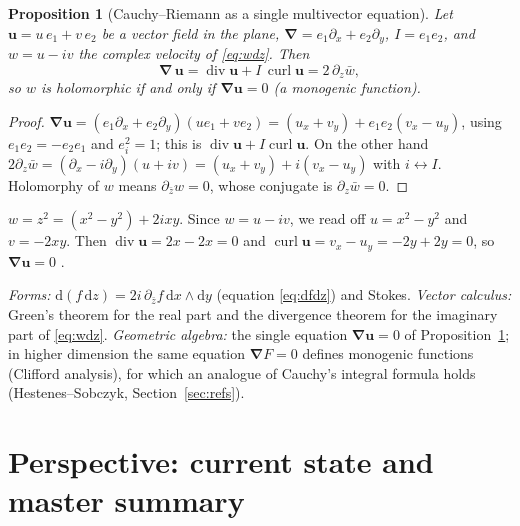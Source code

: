 \documentclass[11pt,a4paper]{article}
\newcounter{thm}[section]
\numberwithin{equation}{section}
\theoremstyle{definition}
\theoremstyle{plain}
\newtheorem{proposition}[thm]{Proposition}
\newcommand{\dd}{\mathrm{d}}
\newcommand{\pss}{I}
\newcommand{\vd}{\boldsymbol{\nabla}}               %
\begin{document}
\begin{proposition}[Cauchy--Riemann as a single multivector equation]\label{prop:CRga}
Let $\mathbf u=u\,e_1+v\,e_2$ be a vector field in the plane, $\vd=e_1\partial_x+e_2\partial_y$, $\pss=e_1e_2$, and $w=u-iv$ the complex velocity of \eqref{eq:wdz}. Then
\[
\vd\,\mathbf u=\operatorname{div}\mathbf u+\pss\,\operatorname{curl}\mathbf u=2\,\partial_z\bar w,
\]
so $w$ is holomorphic if and only if $\vd\mathbf u=0$ (a \emph{monogenic} function).
\end{proposition}
\begin{proof}
$\vd\mathbf u=(e_1\partial_x+e_2\partial_y)(ue_1+ve_2)=(u_x+v_y)+e_1e_2(v_x-u_y)$, using $e_1e_2=-e_2e_1$ and $e_i^2=1$; this is $\operatorname{div}\mathbf u+\pss\operatorname{curl}\mathbf u$. On the other hand $2\partial_z\bar w=(\partial_x-i\partial_y)(u+iv)=(u_x+v_y)+i(v_x-u_y)$ with $i\leftrightarrow\pss$. Holomorphy of $w$ means $\partial_{\bar z}w=0$, whose conjugate is $\partial_z\bar w=0$.
\end{proof}

\begin{example}\label{ex:monogenic}
$w=z^2=(x^2-y^2)+2ixy$. Since $w=u-iv$, we read off $u=x^2-y^2$ and $v=-2xy$. Then $\operatorname{div}\mathbf u=2x-2x=0$ and $\operatorname{curl}\mathbf u=v_x-u_y=-2y+2y=0$, so $\vd\mathbf u=0$ \checkmark.
\end{example}

\begin{synthesis}
\emph{Forms:} $\dd(f\,\dd z)=2i\,\partial_{\bar z}f\,\dd x\wedge\dd y$ (equation \eqref{eq:dfdz}) and Stokes. \emph{Vector calculus:} Green's theorem for the real part and the divergence theorem for the imaginary part of \eqref{eq:wdz}. \emph{Geometric algebra:} the single equation $\vd\mathbf u=0$ of Proposition~\ref{prop:CRga}; in higher dimension the same equation $\vd F=0$ defines monogenic functions (Clifford analysis), for which an analogue of Cauchy's integral formula holds (Hestenes--Sobczyk, Section~\ref{sec:refs}).
\end{synthesis}


\clearpage
\part{Perspective: current state and master summary}\label{part:perspective}
\end{document}
